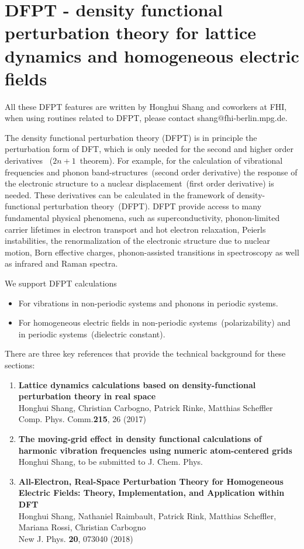 \section{DFPT - density functional perturbation theory for lattice dynamics and homogeneous electric fields}
\label{Sec:DFPT}

All these DFPT features are written by Honghui Shang and coworkers at FHI, when using routines
related to DFPT, please contact shang@fhi-berlin.mpg.de.

The density functional perturbation theory (DFPT) is in principle the perturbation form of DFT, which is only needed for the second and higher order derivatives ~($2n+1$~theorem). For example, for the calculation of vibrational frequencies and phonon band-structures~(second order derivative) the response of the electronic structure to a nuclear displacement~(first order derivative) is needed. These derivatives can be calculated in the framework of density-functional perturbation theory~(DFPT). DFPT provide access to many fundamental physical phenomena, such as superconductivity, phonon-limited carrier lifetimes in electron transport and hot electron relaxation,  Peierls instabilities, the renormalization of the electronic structure due to nuclear motion,  Born effective charges, phonon-assisted transitions in spectroscopy as well as infrared and Raman spectra.


We support DFPT calculations
\begin{itemize}
  \item  For vibrations in non-periodic systems and phonons in periodic systems. 
  \item  For homogeneous electric fields in non-periodic systems~(polarizability) and in periodic systems~(dielectric constant).
\end{itemize}

There are three key references that provide the technical background for these sections:

\begin{enumerate}
\item \textbf{Lattice dynamics calculations based on density-functional perturbation theory in real space} \\
Honghui Shang, Christian Carbogno, Patrick Rinke, Matthias Scheffler \\
Comp. Phys. Comm.\textbf{215}, 26 (2017)

\item \textbf{The moving-grid effect in density functional calculations of harmonic vibration frequencies using numeric atom-centered grids} \\
Honghui Shang, to be submitted to  J. Chem. Phys. 

\item \textbf{All-Electron, Real-Space Perturbation Theory for Homogeneous Electric Fields: Theory, Implementation, and Application within DFT}  \\
Honghui Shang, Nathaniel Raimbault, Patrick Rink, Matthias Scheffler, Mariana Rossi, Christian Carbogno \\ New J. Phys. \textbf{20}, 073040 (2018)
\end{enumerate}

